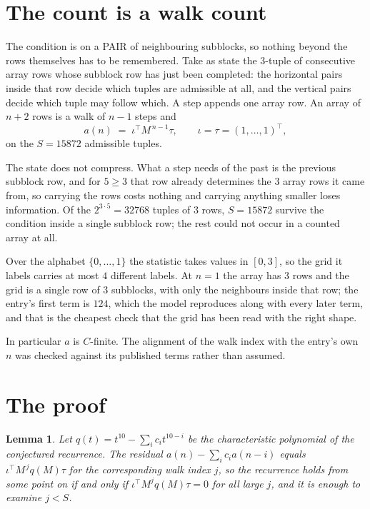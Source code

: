 \documentclass[11pt,a4paper]{article}
\theoremstyle{plain}
\newtheorem{lemma}[theorem]{Lemma}
\theoremstyle{definition}
\begin{document}
\section{The count is a walk count}

The condition is on a PAIR of neighbouring subblocks, so nothing beyond the
rows themselves has to be remembered. Take as state the $3$-tuple of consecutive array rows
whose subblock row has just been completed: the horizontal pairs inside that row decide which
tuples are admissible at all, and the vertical pairs decide which tuple may follow which. A
step appends one array row. An array of $n+2$ rows is a walk of $n-1$ steps and
\[
a(n)\;=\;\iota^{\!\top}M^{\,n-1}\tau,\qquad\iota=\tau=(1,\dots,1)^{\!\top},
\]
on the $S=15872$ admissible tuples.

The state does not compress. What a step needs of the past is the previous subblock row, and
for $5\ge3$ that row already determines the $3$ array rows it came from, so carrying the
rows costs nothing and carrying anything smaller loses information. Of the $2^{3\cdot
5}=32768$ tuples of $3$ rows, $S=15872$ survive the condition inside a single subblock row;
the rest could not occur in a counted array at all.

Over the alphabet $\{0,\dots,1\}$ the statistic takes values in $[0,3]$, so the
grid it labels carries at most $4$ different labels. At $n=1$ the array has $3$
rows and the grid is a single row of $3$
subblocks, with only the neighbours inside that row; the entry's first term is
$124$, which the model reproduces along with every later term, and that is the cheapest
check that the grid has been read with the right shape.

In particular $a$ is $C$-finite. The alignment of the walk index with the entry's own $n$ was
checked against its published terms rather than assumed.

\section{The proof}

\begin{lemma}\label{lem:crit}
Let $q(t)=t^{10}-\sum_i c_it^{10-i}$ be the characteristic polynomial of the
conjectured recurrence. The residual $a(n)-\sum_ic_ia(n-i)$ equals
$\iota^{\!\top}M^{\,j}q(M)\tau$ for the corresponding walk index $j$, so the recurrence
holds from some point on if and only if $\iota^{\!\top}M^{j}q(M)\tau=0$ for all large $j$,
and it is enough to examine $j<S$.
\end{lemma}
\end{document}
